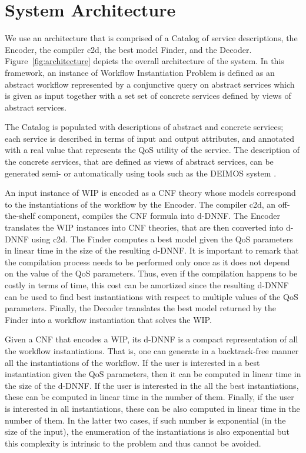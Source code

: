 \documentclass{llncs}
\begin{document}
\section{System Architecture}

We use an architecture that is comprised of a Catalog of service descriptions,
the Encoder, the compiler c2d, the best model Finder, and the Decoder.
Figure~\ref{fig:architecture} depicts the overall architecture of the system.
In this framework, an instance of Workflow Instantiation Problem is defined as an
abstract workflow represented by a conjunctive query on abstract services which
is given as input together with a set set of concrete services defined by views
of abstract services. 

The Catalog is populated with descriptions of abstract and concrete services;
each service is described in terms of input and output attributes, and annotated
with a real value that represents the QoS utility of the service.
The description of the concrete services, that are defined as views of abstract
services, can be generated semi- or automatically using tools such as the DEIMOS
system \cite{AmbiteISWC09}. 

An input instance of WIP is encoded as a CNF theory whose models correspond to
the instantiations of the workflow by the Encoder. The compiler c2d, an off-the-shelf
component, compiles the CNF formula into d-DNNF.
The Encoder translates the WIP instances into CNF theories, that are then converted
into d-DNNF using c2d. The Finder computes a best model given the QoS parameters
in linear time in the size of the resulting d-DNNF. It is important to remark
that the compilation process needs to be performed only once as it does not
depend on the value of the QoS parameters. Thus, even if the compilation happens
to be costly in terms of time, this cost can be amortized since the resulting
d-DNNF can be used to find best instantiations with respect to multiple values
of the QoS parameters.
Finally, the Decoder translates the best model returned by the Finder into
a workflow instantiation that solves the WIP.

Given a CNF that encodes a WIP, its d-DNNF is a compact representation of
all the workflow instantiations. That is, one can generate in a backtrack-free
manner all the instantiations of the workflow. If the user is interested in
a best instantiation given the QoS parameters, then it can be computed in
linear time in the size of the d-DNNF. If the user is interested in the 
all the best instantiations, these can be computed in linear time in the
number of them. Finally, if the user is interested in all instantiations,
these can be also computed in linear time in the number of them.
In the latter two cases, if such number is exponential (in the size of the
input), the enumeration of the instantiations is also exponential but
this complexity is intrinsic to the problem and thus cannot be avoided.
\end{document}
